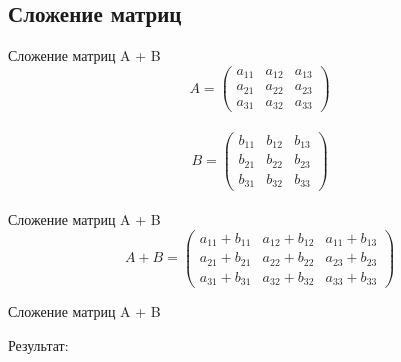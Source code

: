 \documentclass[12pt]{beamer}
\begin{document}
\subsection{Сложение матриц}
\begin{frame}{Сложение матриц A + B}
\[
  A = 
  \begin{pmatrix}
    a_{11} & a_{12} & a_{13}\\
    a_{21} & a_{22} & a_{23}\\
    a_{31} & a_{32} & a_{33}
  \end{pmatrix}
\]
\\
\[
  B = 
  \begin{pmatrix}
    b_{11} & b_{12} & b_{13}\\
    b_{21} & b_{22} & b_{23}\\
    b_{31} & b_{32} & b_{33}
  \end{pmatrix}
\]
\\
\vspace{0.5cm}
Сложение матриц A + B
\\
\[
  A + B = 
  \begin{pmatrix}
    a_{11} + b_{11} & a_{12} + b_{12} & a_{11} + b_{13}\\
    a_{21} + b_{21} & a_{22} + b_{22} & a_{23} + b_{23}\\
    a_{31} + b_{31} & a_{32} + b_{32} & a_{33} + b_{33}
  \end{pmatrix}
\]
\end{frame}


\begin{frame}{Сложение матриц A + B}

Результат: \\

\end{frame}
\end{document}
